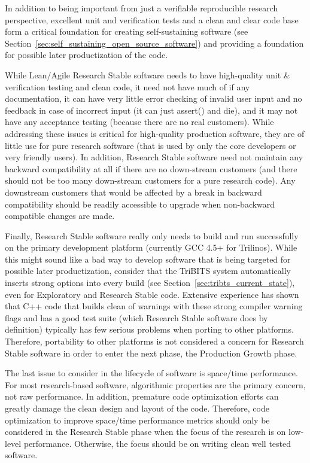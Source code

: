 \documentclass[11pt]{SANDreport}
\begin{document}
In addition to
being important from just a verifiable reproducible research
perspective, excellent unit and verification tests and a clean and
clear code base form a critical foundation for creating
self-sustaining software (see
Section~\ref{sec:self_sustaining_open_source_software}) and providing
a foundation for possible later productization of the code.

While Lean/Agile Research Stable software needs to have high-quality
unit \& verification testing and clean code, it need not have much of
if any documentation, it can have very little error checking of
invalid user input and no feedback in case of incorrect input (it can
just assert() and die), and it may not have any acceptance testing
(because there are no real customers).  While addressing these issues
is critical for high-quality production software, they are of little
use for pure research software (that is used by only the core
developers or very friendly users).  In addition,
Research Stable software need not maintain any backward compatibility
at all if there are no down-stream customers (and there should not be
too many down-stream customers for a pure research code).  Any
downstream customers that would be affected by a break in backward
compatibility should be readily accessible to upgrade when non-backward
compatible changes are made.

Finally, Research Stable software really only needs to build and run
successfully on the primary development platform (currently GCC 4.5+
for Trilinos).  While this might sound like a bad way to develop
software that is being targeted for possible later productization,
consider that the TriBITS system automatically inserts strong options
into every build (see Section~\ref{sec:tribts_current_state}), even
for Exploratory and Research Stable code.  Extensive experience has
shown that C++ code that builds clean of warnings with these strong
compiler warning flags and has a good test suite (which Research
Stable software does by definition) typically has few serious problems
when porting to other platforms.  Therefore, portability to other
platforms is not considered a concern for Research Stable software in
order to enter the next phase, the Production Growth phase.

The last issue to consider in the lifecycle of software is space/time
performance.  For most research-based software, algorithmic properties
are the primary concern, not raw performance.  In addition, premature
code optimization efforts can greatly damage the clean design and
layout of the code.  Therefore, code optimization to improve
space/time performance metrics should only be considered in the
Research Stable phase when the focus of the research is on low-level
performance.  Otherwise, the focus should be on writing clean well
tested software.
\end{document}
